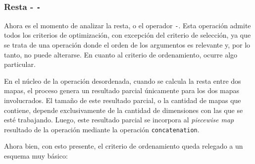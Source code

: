 \subsubsection{Resta - \texttt{-}}

Ahora es el momento de analizar la resta, o el operador \texttt{-}. Esta operación admite todos los criterios de optimización, con excepción del criterio de selección, ya que se trata de una operación donde el orden de los argumentos es relevante y, por lo tanto, no puede alterarse. En cuanto al criterio de ordenamiento, ocurre algo particular.

En el núcleo de la operación desordenada, cuando se calcula la resta entre dos mapas, el proceso genera un resultado parcial únicamente para los dos mapas involucrados. El tamaño de este resultado parcial, o la cantidad de mapas que contiene, depende exclusivamente de la cantidad de dimensiones con las que se esté trabajando. Luego, este resultado parcial se incorpora al \textit{piecewise map} resultado de la operación mediante la operación \texttt{concatenation}.

Ahora bien, con esto presente, el criterio de ordenamiento queda relegado a un esquema muy básico:

\begin{center}
\end{center}

